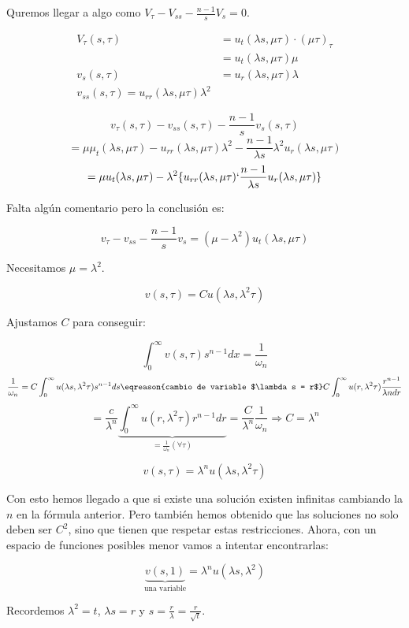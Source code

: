		Quremos llegar a algo como $V_\tau - V_{ss} - \frac{n-1}{s} V_{s} = 0$.

		\begin{align*}
			V_\tau (s,\tau) &= u_t (\lambda s, \mu \tau) \cdot (\mu \tau)_{\tau} \\
				&= u_t(\lambda s, \mu \tau) \mu \\
				v_s(s,\tau) &= u_r(\lambda s, \mu \tau) \lambda \\
				v_{ss}(s,\tau) = u_{rr} (\lambda s, \mu \tau) \lambda^2
		\end{align*}

		\[ v_\tau (s,\tau) - v_{ss}(s,\tau) - \frac{n-1}{s} v_s(s,\tau)\]
		\[ = \mu \mu_t(\lambda s, \mu \tau) - u_{rr}(\lambda s, \mu \tau) \lambda^2 - \frac{n-1}{\lambda s} \lambda^2 u_r(\lambda s, \mu \tau) \]
		\[ = \mu u_t(\lambda s, \mu \tau) - \lambda^2 \{ u_{rr}(\lambda s, \mu \tau) `\frac{n-1}{\lambda s} u_r(\lambda s, \mu \tau)\}\]

		Falta algún comentario pero la conclusión es:

		\[ v_\tau - v_{ss} - \frac{n-1}{s} v_s = (\mu - \lambda^2) u_t(\lambda s, \mu \tau)  \]

		Necesitamos $\mu = \lambda^2$.

		\[ v(s,\tau) = Cu(\lambda s, \lambda^2 \tau)\]

		Ajustamos $C$ para conseguir:

		\[ \int_0^\infty v(s, \tau) s^{n-1} dx = \frac{1}{\omega_{n}} \]
		\[ \frac{1}{\omega_n} = C \int_0^\infty u(\lambda s, \lambda^2 \tau) s^{n-1} ds \eqreason{cambio de variable $\lambda s = r$} C \int_0^\infty u(r, \lambda^2 \tau) \frac{r^{n-1}}{\lambda n dr}  \]
		\[ = \frac{c}{\lambda^n}  \underbrace{\int_0^\infty   u(r, \lambda^2\tau) r^{n-1} dr}_{= \frac{1}{\omega_n} (\forall \tau)}  = \frac{C}{\lambda^n}\frac{1}{\omega_n} \Rightarrow C = \lambda^n\]

		\[ v(s,\tau) = \lambda^n u(\lambda s, \lambda^2 \tau)\]

		Con esto hemos llegado a que si existe una solución existen infinitas cambiando la $n$ en la fórmula anterior. Pero también hemos obtenido que las soluciones no solo deben ser $C^2$, sino que tienen que respetar estas restricciones. Ahora, con un espacio de funciones posibles menor vamos a intentar encontrarlas:

		\[ \underbrace{v(s,1)}_{\text{una variable}} = \lambda^n u (\lambda s, \lambda^2) \]

		Recordemos $\lambda^2 = t$, $\lambda s = r$ y $s = \frac{r}{\lambda} = \frac{r}{\sqrt{t}}$.

